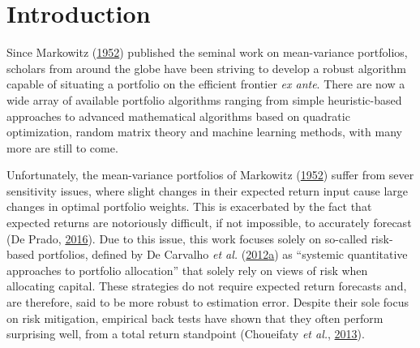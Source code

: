 \documentclass[11pt,preprint, authoryear]{elsarticle}
\numberwithin{equation}{section}
\numberwithin{figure}{section}
\numberwithin{table}{section}
\begin{document}
\pagestyle{fancy}
\chead{}
\rhead{}
\lfoot{}
\lhead{}
\cfoot{}


\headsep 35pt %




\hypertarget{introduction}{%
\section{\texorpdfstring{Introduction
\label{Introduction}}{Introduction }}\label{introduction}}

Since Markowitz (\protect\hyperlink{ref-markowitz}{1952}) published the
seminal work on mean-variance portfolios, scholars from around the globe
have been striving to develop a robust algorithm capable of situating a
portfolio on the efficient frontier \emph{ex ante}. There are now a wide
array of available portfolio algorithms ranging from simple
heuristic-based approaches to advanced mathematical algorithms based on
quadratic optimization, random matrix theory and machine learning
methods, with many more are still to come.

Unfortunately, the mean-variance portfolios of Markowitz
(\protect\hyperlink{ref-markowitz}{1952}) suffer from sever sensitivity
issues, where slight changes in their expected return input cause large
changes in optimal portfolio weights. This is exacerbated by the fact
that expected returns are notoriously difficult, if not impossible, to
accurately forecast (De Prado, \protect\hyperlink{ref-lopez}{2016}). Due
to this issue, this work focuses solely on so-called risk-based
portfolios, defined by De Carvalho \emph{et al.}
(\protect\hyperlink{ref-leote}{2012}\protect\hyperlink{ref-leote}{a}) as
``systemic quantitative approaches to portfolio allocation'' that solely
rely on views of risk when allocating capital. These strategies do not
require expected return forecasts and, are therefore, said to be more
robust to estimation error. Despite their sole focus on risk mitigation,
empirical back tests have shown that they often perform surprising well,
from a total return standpoint (Choueifaty \emph{et al.},
\protect\hyperlink{ref-choueifaty2013}{2013}).
\end{document}
